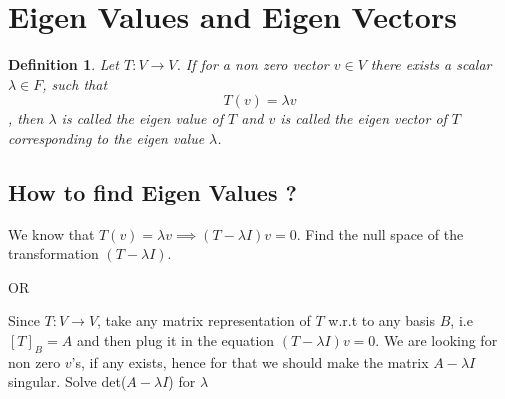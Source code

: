 \documentclass[a4paper, titlepage]{article}
\newtheorem{definition}{Definition}[section]
\begin{document}
        

\section{Eigen Values and Eigen Vectors}
    \begin{definition}
        Let $T: V \to V$. If for a non zero vector $v \in V$ there
        exists a scalar $\lambda \in F$, such that \[ T(v) = \lambda v \],
        then $\lambda$ is called the eigen value of $T$ and $v$ is
        called the eigen vector of $T$ corresponding to the eigen value
        $\lambda$.
    \end{definition}
    \subsection{How to find Eigen Values ?}
        We know that $T(v) = \lambda v \implies (T-\lambda I)v = 0$.
        Find the null space of the transformation $(T-\lambda I)$. 
        
        \begin{center}
            OR
        \end{center}
        
        \noindent Since $T: V \to V$, take any matrix representation of $T$
        w.r.t to any basis $B$, i.e $[T]_B = A$ and then plug it in
        the equation $(T-\lambda I)v = 0$. We are looking for non
        zero $v$'s, if any exists, hence for that we should make the
        matrix $A - \lambda I$ singular. Solve det($A - \lambda I$)
        for $\lambda$
\end{document}
